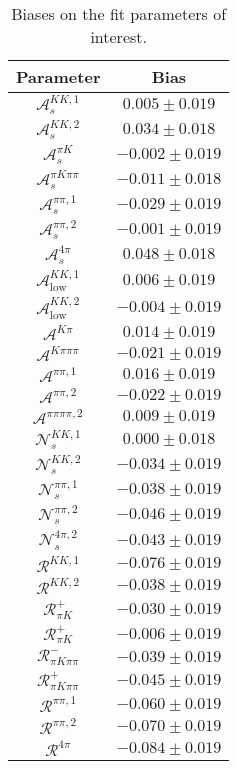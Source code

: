 \begin{table}
  \centering
  \begin{tabular}{cc}
  \toprule
      Parameter & Bias \\
  \midrule
      $\mathcal{A}_s^{KK,1}$ & $0.005 \pm 0.019$ \\
      $\mathcal{A}_s^{KK,2}$ & $0.034 \pm 0.018$ \\
      $\mathcal{A}_s^{\pi K}$ & $-0.002 \pm 0.019$ \\
      $\mathcal{A}_s^{\pi K\pi\pi}$ & $-0.011 \pm 0.018$ \\
      $\mathcal{A}_s^{\pi\pi,1}$ & $-0.029 \pm 0.019$ \\
      $\mathcal{A}_s^{\pi\pi,2}$ & $-0.001 \pm 0.019$ \\
      $\mathcal{A}_s^{4\pi}$ & $0.048 \pm 0.018$ \\
      $\mathcal{A}_\mathrm{low}^{KK,1}$ & $0.006 \pm 0.019$ \\
      $\mathcal{A}_\mathrm{low}^{KK,2}$ & $-0.004 \pm 0.019$ \\
      $\mathcal{A}^{K\pi}$ & $0.014 \pm 0.019$ \\
      $\mathcal{A}^{K\pi\pi\pi}$ & $-0.021 \pm 0.019$ \\
      $\mathcal{A}^{\pi\pi,1}$ & $0.016 \pm 0.019$ \\
      $\mathcal{A}^{\pi\pi,2}$ & $-0.022 \pm 0.019$ \\
      $\mathcal{A}^{\pi\pi\pi\pi,2}$ & $0.009 \pm 0.019$ \\
      $\mathcal{N}_s^{KK,1}$ & $0.000 \pm 0.018$ \\
      $\mathcal{N}_s^{KK,2}$ & $-0.034 \pm 0.019$ \\
      $\mathcal{N}_s^{\pi\pi,1}$ & $-0.038 \pm 0.019$ \\
      $\mathcal{N}_s^{\pi\pi,2}$ & $-0.046 \pm 0.019$ \\
      $\mathcal{N}_s^{4\pi,2}$ & $-0.043 \pm 0.019$ \\
      $\mathcal{R}^{KK,1}$ & $-0.076 \pm 0.019$ \\
      $\mathcal{R}^{KK,2}$ & $-0.038 \pm 0.019$ \\
      $\mathcal{R}_{\pi K}^+$ & $-0.030 \pm 0.019$ \\
      $\mathcal{R}_{\pi K}^+$ & $-0.006 \pm 0.019$ \\
      $\mathcal{R}_{\pi K\pi\pi}^-$ & $-0.039 \pm 0.019$ \\
      $\mathcal{R}_{\pi K\pi\pi}^+$ & $-0.045 \pm 0.019$ \\
      $\mathcal{R}^{\pi\pi,1}$ & $-0.060 \pm 0.019$ \\
      $\mathcal{R}^{\pi\pi,2}$ & $-0.070 \pm 0.019$ \\
      $\mathcal{R}^{4\pi}$ & $-0.084 \pm 0.019$ \\
      \bottomrule
  \end{tabular}
  \caption{Biases on the fit parameters of interest.}
\label{tab:biases}
\end{table}
